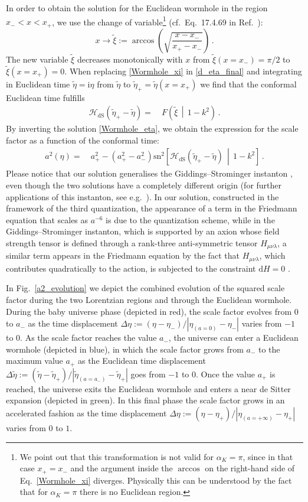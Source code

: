 \documentclass[aps,nofootinbib,prd,superscriptaddress,eqsecnum,showpacs,showkeys,preprintnumbers,altaffilletter]{revtex4}
\def\D{\mathrm{d}}
\def\I{\mathrm{i}}
\def\be{\begin{equation}}
\def\ee{\end{equation}}
\newcommand{\cHdS}{{\mathcal{H}}_{\mathrm{dS}}}
\newcommand{\txi}{\tilde{\xi}}
\begin{document}
In order to obtain the solution for the Euclidean wormhole in the region $x_- < x < x_+$, we use the change of variable\footnote{We point out that this transformation is not valid for $\alpha_K=\pi$, since in that case $x_+=x_-$ and the argument inside the $\arccos$ on the right-hand side of Eq.~\eqref{Wormhole_xi} diverges. Physically this can be understood by the fact that for $\alpha_K=\pi$ there is no Euclidean region.} (cf.~Eq.~17.4.69 in Ref.~\cite{abra}):
\be
	\label{Wormhole_xi}
	x\rightarrow\txi := \arccos\left(\sqrt{\frac{x-x_-}{x_+-x_-}}\right)
	\,.
\ee
The new variable $\txi $ decreases monotonically with $x$ from $\txi(x=x_-)=\pi/2$ to $\txi(x=x_+)=0$. When replacing \eqref{Wormhole_xi} in \eqref{d_eta_final} and integrating in Euclidean time $\tilde\eta=\I\eta$ from $\tilde\eta$ to $\tilde\eta_+=\tilde\eta(x=x_+)$ we find that the conformal Euclidean time fulfills
\begin{align}
	\label{Wormhole_eta}
	\cHdS\left(\tilde\eta_+ - \tilde\eta\right)
	 =&~
	F\left(\txi \,\middle|\,  1-k^ 2\right)
	 \,.
\end{align}
By inverting the solution \eqref{Wormhole_eta}, we obtain the expression for the scale factor as a function of the conformal time:
\begin{align}
	a^2(\eta) 
	= &~
	a_+^2 - \left(a_+^2 - a_-^2\right)\mathrm{sn}^2\!\left[{\cHdS} \left(\tilde\eta_+ - \tilde\eta\right)\,\middle|\, 1-k^2 \right]
		\,.
\end{align}
Please notice that our solution generalises the Giddings--Strominger instanton \cite{Giddings:1987cg}, even though the two solutions have a completely different origin (for further applications of this instanton, see e.g.~\cite{sengupta14}). In our solution, constructed in the framework of the third quantization, the appearance of a term in the Friedmann equation that scales as $a^{-6}$ is due to the quantization scheme, while in the Giddings--Strominger instanton, which is supported by an axion whose field strength tensor is defined through a rank-three anti-symmetric tensor $H_{\mu\nu\lambda}$, a similar term appears in the Friedmann equation by the fact that $H_{\mu\nu\lambda}$, which contributes quadratically to the action, is subjected to the constraint $\D H =0$ \cite{Giddings:1987cg}.

{ In Fig.~\ref{a2_evolution} we depict the combined evolution of the squared scale factor during the two Lorentzian regions and through the Euclidean wormhole.
During the baby universe phase (depicted in red), the scale factor evolves from $0$ to $a_-$ as the time displacement $\Delta\eta:=(\eta-\eta_-)/|\eta_{(a=0)}-\eta_-|$ varies from $-1$ to $0$.
As the scale factor reaches the value $a_-$, the universe can enter a Euclidean wormhole (depicted in blue), in which the scale factor grows from $a_-$ to the maximum value $a_+$ as the Euclidean time displacement $\Delta\tilde\eta:=(\tilde\eta - \tilde\eta_+)/|\tilde\eta_{(a=a_-)}-\tilde\eta_+|$ goes from $-1$ to $0$.
Once the value $a_+$ is reached, the universe exits the Euclidean wormhole and enters a near de Sitter expansion (depicted in green). In this final phase the scale factor grows in an accelerated fashion as the time displacement $\Delta\eta:=(\eta-\eta_+)/|\eta_{(a=+\infty)}-\eta_+|$ varies from $0$ to $1$.
}
\end{document}
